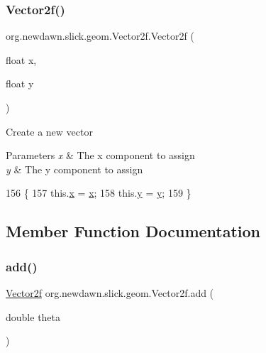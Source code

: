 \subsubsection{\texorpdfstring{Vector2f()}{Vector2f()}\hspace{0.1cm}{\footnotesize\ttfamily [5/5]}}
{\footnotesize\ttfamily org.\+newdawn.\+slick.\+geom.\+Vector2f.\+Vector2f (\begin{DoxyParamCaption}\item[{float}]{x,  }\item[{float}]{y }\end{DoxyParamCaption})\hspace{0.3cm}{\ttfamily [inline]}}

Create a new vector


\begin{DoxyParams}{Parameters}
{\em x} & The x component to assign \\
\hline
{\em y} & The y component to assign \\
\hline
\end{DoxyParams}

\begin{DoxyCode}
156                                       \{
157         this.\mbox{\hyperlink{classorg_1_1newdawn_1_1slick_1_1geom_1_1_vector2f_a3c72cdf13ebc511a472e1a02002fa579}{x}} = \mbox{\hyperlink{classorg_1_1newdawn_1_1slick_1_1geom_1_1_vector2f_a3c72cdf13ebc511a472e1a02002fa579}{x}};
158         this.\mbox{\hyperlink{classorg_1_1newdawn_1_1slick_1_1geom_1_1_vector2f_aa03914f0c3d32063aa90e5bd7b74688e}{y}} = \mbox{\hyperlink{classorg_1_1newdawn_1_1slick_1_1geom_1_1_vector2f_aa03914f0c3d32063aa90e5bd7b74688e}{y}};
159     \}
\end{DoxyCode}


\subsection{Member Function Documentation}
\mbox{\label{classorg_1_1newdawn_1_1slick_1_1geom_1_1_vector2f_a5ff3506ceb149848fd7ea65ef00176c2}} 
\subsubsection{\texorpdfstring{add()}{add()}\hspace{0.1cm}{\footnotesize\ttfamily [1/2]}}
{\footnotesize\ttfamily \mbox{\hyperlink{classorg_1_1newdawn_1_1slick_1_1geom_1_1_vector2f}{Vector2f}} org.\+newdawn.\+slick.\+geom.\+Vector2f.\+add (\begin{DoxyParamCaption}\item[{double}]{theta }\end{DoxyParamCaption})\hspace{0.3cm}{\ttfamily [inline]}}


